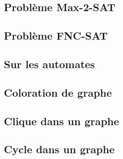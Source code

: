 \documentclass[a4paper,french,bookmarks]{book}
\begin{document}
    \subsection{Problème Max-2-SAT}

    \subsection{Problème FNC-SAT}

    \subsection{Sur les automates}

    \subsection{Coloration de graphe}

    \subsection{Clique dans un graphe}

    \subsection{Cycle dans un graphe}

    
    
\end{document}
